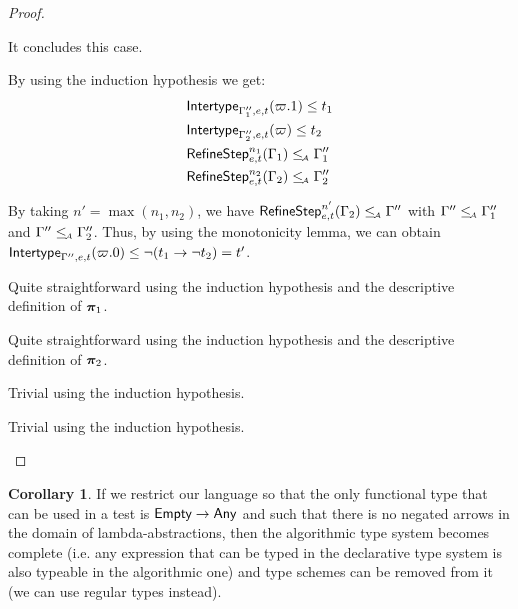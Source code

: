 \documentclass[a4paper]{article}
\theoremstyle{definition}
\newtheorem{corollary}{Corollary}
\begin{document}
\begin{proof}
\begin{description}
\begin{description}
      It concludes this case.

      \item[\Rule{PAppL}] By using the induction hypothesis we get:
      \begin{align*}
        &\textsf{Intertype}_{\Gamma_1'',e,t} (\varpi.1) \leq t_1\\
        &\textsf{Intertype}_{\Gamma_2'',e,t} (\varpi) \leq t_2\\
        &\textsf{RefineStep}_{e,t}^{n_1} (\Gamma_1) \leq_{\!\scriptscriptstyle\mathcal{A}} \Gamma_1''\\
        &\textsf{RefineStep}_{e,t}^{n_2} (\Gamma_2) \leq_{\!\scriptscriptstyle\mathcal{A}} \Gamma_2''
      \end{align*}

      By taking $n'=\max (n_1,n_2)$,
      we have $\textsf{RefineStep}_{e,t}^{n'} (\Gamma_2) \leq_{\!\scriptscriptstyle\mathcal{A}} \Gamma''$ with $\Gamma'' \leq_{\!\scriptscriptstyle\mathcal{A}} \Gamma_1''$ and $\Gamma'' \leq_{\!\scriptscriptstyle\mathcal{A}} \Gamma_2''$.
      Thus, by using the monotonicity lemma, we can obtain $\textsf{Intertype}_{\Gamma'',e,t} (\varpi.0) \leq \neg (t_1\to \neg t_2) = t'$.
  
      \item[\Rule{PPairL}] Quite straightforward using the induction hypothesis and the descriptive definition of $\boldsymbol{\pi}_1$.
      \item[\Rule{PPairR}] Quite straightforward using the induction hypothesis and the descriptive definition of $\boldsymbol{\pi}_2$.
      \item[\Rule{PFst}] Trivial using the induction hypothesis.
      \item[\Rule{PSnd}] Trivial using the induction hypothesis.
    \end{description}
  \end{description}
  \end{proof}

  \begin{corollary}\label{app:completeness}
    If we restrict our language so that the only functional type that can be used in a test is $\textsf{Empty}\to \textsf{Any}$
    and such that there is no negated arrows in the domain of lambda-abstractions,
    then the algorithmic type system becomes complete
    (i.e. any expression that can be typed in the declarative type system is also typeable in the algorithmic one)
    and type schemes can be removed from it (we can use regular types instead).
  \end{corollary}
\end{document}
